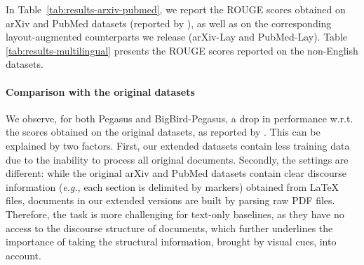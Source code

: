                             

In Table~\ref{tab:results-arxiv-pubmed}, we report the ROUGE scores obtained on arXiv and PubMed datasets (reported by \citet{zaheer2020big}), as well as on the corresponding layout-augmented counterparts we release (arXiv-Lay and PubMed-Lay). Table \ref{tab:results-multilingual} presents the ROUGE scores reported on the non-English datasets.

\paragraph{Comparison with the original datasets} We observe, for both Pegasus and BigBird-Pegasus, a drop in performance w.r.t. the scores obtained on the original datasets, as reported by \citet{zaheer2020big}. This can be explained by two factors. First, our extended datasets contain less training data due to the inability to process all original documents. Secondly, the settings are different: while the original arXiv and PubMed datasets contain clear discourse information (\textit{e.g.}, each section is delimited by markers) obtained from \LaTeX~ files, documents in our extended versions are built by parsing raw PDF files. Therefore, the task is more challenging for text-only baselines, as they have no access to the discourse structure of documents, which further underlines the importance of taking the structural information, brought by visual cues, into account.


